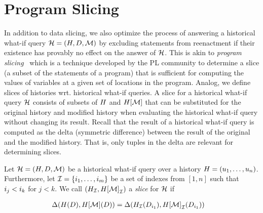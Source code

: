 \section{Program Slicing}
\label{sec:dep-ana}



In addition to data slicing,
we also optimize the process of answering a historical what-if query $\mathcal{H} = (H, D, \mathcal{M})$
by excluding statements from reenactment if their existence has provably no effect on the answer of $\mathcal{H}$. This is akin to \textit{program slicing}~\cite{cheney07,W81} which is a technique developed by the PL community to determine a slice (a subset of the statements of a program) that is sufficient for computing the values of variables at a given set of locations in the program.
Analog, we define slices of histories wrt. historical what-if queries.
A slice for a historical what-if query $\mathcal{H}$ consists of subsets of $H$ and $H[\mathcal{M}]$ that can be substituted for the original history and modified history when evaluating the historical what-if query without changing its result. Recall that the result of a historical what-if query is computed as the delta (symmetric difference) between the result of the original and the modified history. That is, only tuples in the delta are relevant for determining slices.


\begin{defi}
  Let $\mathcal{H} = (H, D, \mathcal{M})$ be a historical what-if query over a history $H = (u_1, \ldots, u_n)$.
  Furthermore, let $\mathcal{I} = \{ i_1, \ldots, i_m \}$ be a set of indexes from $[1,n]$ such that $i_j < i_k$ for $j < k$.
  We call  $({H}_{\mathcal{I}}, {H[\mathcal{M}]}_{\mathcal{I}})$  a  \emph{slice} for $\mathcal{H}$ if
  
  
  
\begin{gather*}
  \begin{aligned}
    &\Delta(H(D),H[\mathcal{M}](D)) = \Delta({H}_{\mathcal{I}}(D_{i_1}),{H[\mathcal{M}]}_{\mathcal{I}}(D_{i_1}))
  \end{aligned}
\end{gather*}




\end{defi}


